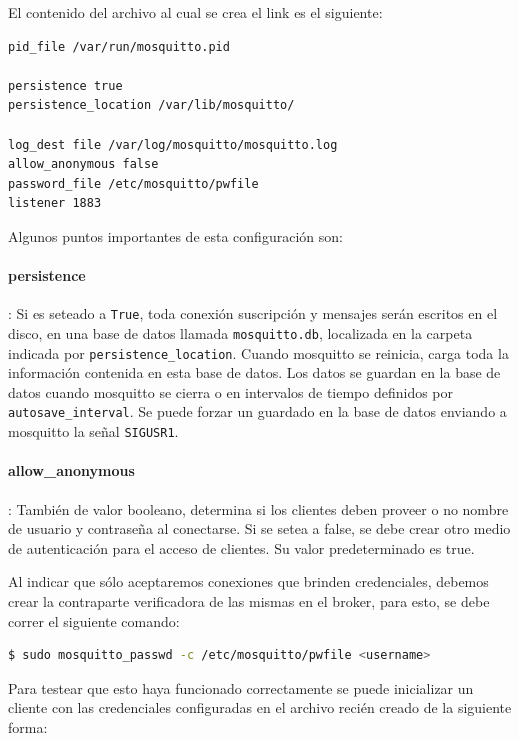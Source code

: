El contenido del archivo al cual se crea el link es el siguiente:
\begin{lstlisting}[language=bash]
pid_file /var/run/mosquitto.pid

persistence true
persistence_location /var/lib/mosquitto/

log_dest file /var/log/mosquitto/mosquitto.log
allow_anonymous false
password_file /etc/mosquitto/pwfile
listener 1883
\end{lstlisting}

Algunos puntos importantes de esta configuración son:


\paragraph{persistence}: 
Si es seteado a \lstinline[columns=fixed]{True}, toda conexión suscripción y mensajes serán escritos en el disco, en una base de datos llamada \lstinline[columns=fixed]{mosquitto.db}, localizada en la carpeta indicada por \lstinline[columns=fixed]{persistence_location}. Cuando mosquitto se reinicia, carga toda la información contenida en esta base de datos. Los datos se guardan en la base de datos cuando mosquitto se cierra o en intervalos de tiempo definidos por \lstinline[columns=fixed]{autosave_interval}. Se puede forzar un guardado en la base de datos enviando a mosquitto la señal \lstinline[columns=fixed]{SIGUSR1}.

\paragraph{allow\_anonymous}:
También de valor booleano, determina si los clientes deben proveer o no nombre de usuario y contraseña al conectarse. Si se setea a false, se debe crear otro medio de autenticación para el acceso de clientes. Su valor predeterminado es true.

Al indicar que sólo aceptaremos conexiones que brinden credenciales, debemos crear la contraparte verificadora de las mismas en el broker, para esto, se debe correr el siguiente comando:

\begin{lstlisting}[language=bash]
  $ sudo mosquitto_passwd -c /etc/mosquitto/pwfile <username>
\end{lstlisting}

Para testear que esto haya funcionado correctamente se puede inicializar un cliente con las credenciales configuradas en el archivo recién creado de la siguiente forma: 

